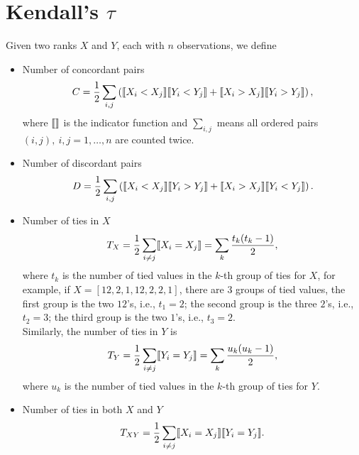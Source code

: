 \section{Kendall's $\tau$}
\label{sec:kendalltau}

Given two ranks $X$ and $Y$, each with $n$ observations, we define
\begin{itemize}
\item Number of concordant pairs 
      \begin{equation*}
      C = \frac{1}{2} \sum_{i,j} \left( \llbracket X_i < X_j \rrbracket  \llbracket Y_i < Y_j \rrbracket + \llbracket X_i > X_j \rrbracket  \llbracket Y_i > Y_j \rrbracket \right),
      \end{equation*}
      where $\llbracket  \rrbracket$ is the indicator function and 
      $\sum_{i,j}$ means all ordered pairs $(i, j),~ i,j=1,\dots,n$ are counted twice.

\item Number of discordant pairs 
      \begin{equation*}
      D = \frac{1}{2} \sum_{i,j} \left( \llbracket X_i < X_j \rrbracket  \llbracket Y_i > Y_j \rrbracket + \llbracket X_i > X_j \rrbracket  \llbracket Y_i < Y_j \rrbracket \right).
      \end{equation*}

\item Number of ties in $X$
      \begin{equation*}
      T_X = \frac{1}{2} \sum_{i \ne j} \llbracket X_i = X_j \rrbracket = \sum_k \frac{t_k (t_k - 1)}{2},
      \end{equation*}
      where $t_k$ is the number of tied values in the $k$-th group of ties for $X$, for example, if
      $X = [12, 2, 1, 12, 2, 2, 1]$, there are $3$ groups of tied values, the first group is the two $12$'s, i.e., $t_1 = 2$;
      the second group is the three $2$'s, i.e., $t_2 = 3$; the third group is the two $1$'s, i.e., $t_3 = 2$. \\
      Similarly, the number of ties in $Y$ is 
      \begin{equation*}
      T_Y = \frac{1}{2} \sum_{i \ne j} \llbracket Y_i = Y_j \rrbracket = \sum_k \frac{u_k (u_k - 1)}{2},
      \end{equation*}
      where $u_k$ is the number of tied values in the $k$-th group of ties for $Y$.

\item Number of ties in both $X$ and $Y$
      \begin{equation*}
      T_{XY} = \frac{1}{2} \sum_{i \ne j} \llbracket X_i = X_j \rrbracket  \llbracket Y_i = Y_j \rrbracket.
      \end{equation*}


\end{itemize}

